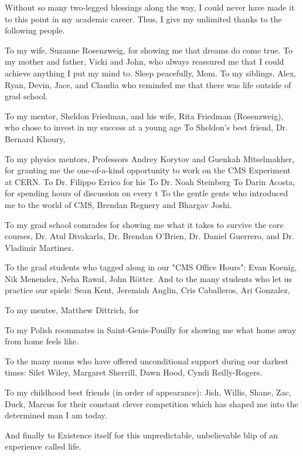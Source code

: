 Without so many two-legged blessings along the way, I could never have made it to this point in my academic career.
Thus, I give my unlimited thanks to the following people.

To my wife, Suzanne Rosenzweig, for showing me that dreams do come true.
To my mother and father, Vicki and John, who always reassured me that I could achieve anything I put my mind to. Sleep peacefully, Mom.
To my siblings, Alex, Ryan, Devin, Jace, and Claudia who reminded me that there was life outside of grad school.

To my mentor, Sheldon Friedman, and his wife, Rita Friedman (Rosenzweig), who chose to invest in my success at a young age
To Sheldon's best friend, Dr. Bernard Khoury, 

To my physics mentors, Professors Andrey Korytov and Guenkah Mitselmakher, for granting me the one-of-a-kind opportunity to work on the CMS Experiment at CERN.
To Dr. Filippo Errico for his 
To Dr. Noah Steinberg
To Darin Acosta, for spending hours of discussion on every t
To the gentle gents who introduced me to the world of CMS, Brendan Regnery and Bhargav Joshi.

To my grad school comrades for showing me what it takes to survive the core courses,
Dr. Atul Divakarla, Dr. Brendan O'Brien, Dr. Daniel Guerrero, and Dr. Vladimir Martinez.

To the grad students who tagged along in our "CMS Office Hours":
Evan Koenig, Nik Menendez, Neha Rawal, John Rötter.
And to the many students who let us practice our spiels:
Sean Kent, Jeremiah Anglin, Cris Caballeros, Ari Gonzalez, 

To my mentee, Matthew Dittrich, for 

To my Polish roommates in Saint-Genis-Pouilly for showing me what home away from home feels like.

To the many moms who have offered unconditional support during our darkest times:
Silet Wiley, Margaret Sherrill, Dawn Hood, Cyndi Reilly-Rogers.

To my childhood best friends (in order of appearance):
Jish, Willis, Shane, Zac, Duck, Marcus for their constant clever competition which has shaped me into the determined man I am today.

And finally to Existence itself for this unpredictable, unbelievable blip of an experience called life.
